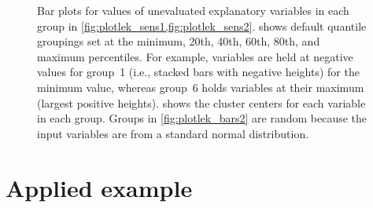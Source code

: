 \documentclass[article]{jss}
\begin{document}
\begin{figure}[t!]  
\centering
{}

\caption{Bar plots for values of unevaluated explanatory variables in each group in \cref{fig:plotlek_sens1,fig:plotlek_sens2}.   shows default quantile groupings set at the minimum, 20th, 40th, 60th, 80th, and maximum percentiles.  For example, variables are held at negative values for group~1 (i.e., stacked bars with negative heights) for the minimum value, whereas group~6 holds variables at their maximum (largest positive heights).  shows the cluster centers for each variable in each group.  Groups in \cref{fig:plotlek_bars2} are random because the input variables are from a standard normal distribution.}
\label{fig:plotlek_bars}
\end{figure}

\section[Applied example]{Applied example}
\end{document}
